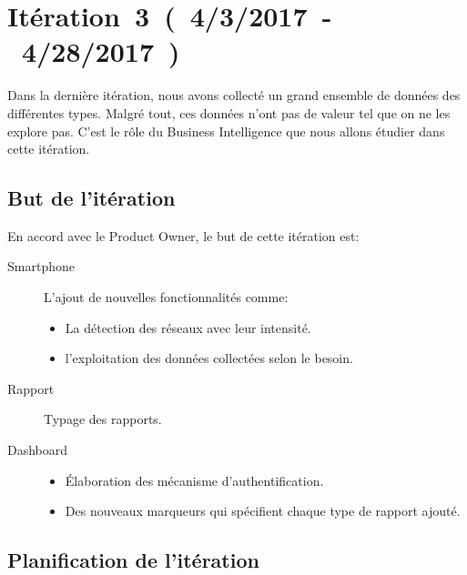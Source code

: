 \chapter{Itération~3~(~4/3/2017~-~4/28/2017~)}

Dans la dernière itération, nous avons collecté un grand ensemble de données
des différentes types. Malgré tout, ces données n'ont pas de valeur tel que on
ne les explore pas. C'est le rôle du Business Intelligence que nous allons
étudier dans cette itération.

\section{But de l'itération}

En accord avec le Product Owner, le but de cette itération est:

\begin{description}
    \item [Smartphone] L'ajout de nouvelles fonctionnalités comme:
        \begin{itemize}
            \item La détection des réseaux avec leur intensité.
            \item l'exploitation des données collectées selon le besoin.
        \end{itemize}
    \item [Rapport] Typage des rapports.
    \item [Dashboard] \textbf{}

        \begin{itemize}
            \item Élaboration des mécanisme d'authentification.
            \item Des nouveaux marqueurs qui spécifient chaque type de rapport
                ajouté.
        \end{itemize}
\end{description}


\section{Planification de l'itération}

